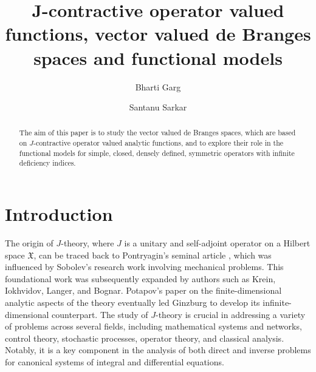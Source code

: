 \documentclass [12pt,reqno]{amsart}
\title [ vector valued de Branges spaces]{ J-contractive operator valued functions, vector valued de Branges spaces and functional models}
\author[Garg]{Bharti Garg}
\author[Sarkar]{Santanu Sarkar}
\numberwithin{equation}{subsection}
\numberwithin{equation}{section}
\begin{document}


\begin{abstract}
The aim of this paper is to study the vector valued de Branges spaces, which are based on $J$-contractive operator valued analytic functions, and to explore their role in the functional models for simple, closed, densely defined, symmetric operators with infinite deficiency indices.
\end{abstract}
\maketitle

\tableofcontents
\section{Introduction}
\label{Section 1}
The origin of \( J \)-theory, where \( J \) is a unitary and self-adjoint operator on a Hilbert space \(\mathfrak{X}\), can be traced back to Pontryagin's seminal article \cite{Pontryagin1}, which was influenced by Sobolev's research work \cite{Sobolev1} involving mechanical problems. This foundational work was subsequently expanded by authors such as Krein, Iokhvidov, Langer, and Bognar. Potapov's paper \cite{Potapov1} on the finite-dimensional analytic aspects of the theory eventually led Ginzburg \cite{Ginzburg1} to develop its infinite-dimensional counterpart.
The study of \( J \)-theory is crucial in addressing a variety of problems across several fields, including mathematical systems and networks, control theory, stochastic processes, operator theory, and classical analysis. Notably, it is a key component in the analysis of both direct and inverse problems for canonical systems of integral and differential equations.
\end{document}
